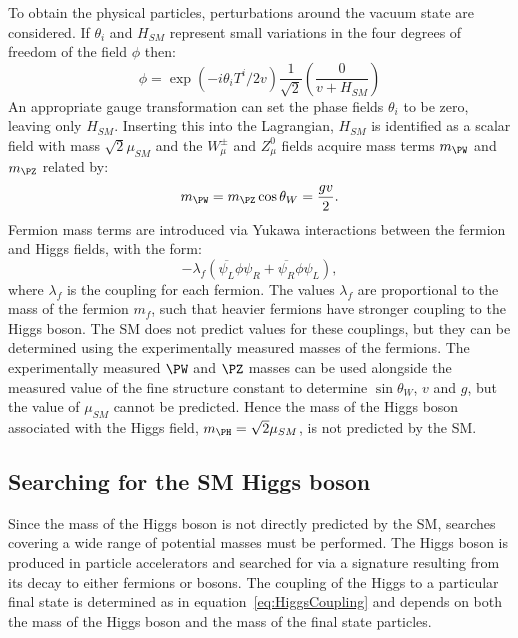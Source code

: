 To obtain the physical particles, perturbations around the vacuum state are
considered. If $\theta_{i}$ and $H_{SM}$ represent small variations in the four
degrees of freedom of the field $\phi$ then:
\begin{equation}
\phi = \exp(-i\theta_{i}T^{i}/2v)\frac{1}{\sqrt{2}}\left(\frac{0}{v+H_{SM}} \right)
\end{equation}
An appropriate gauge transformation can set the phase fields $\theta_{i}$ to be
zero, leaving only $H_{SM}$. Inserting this into the Lagrangian, $H_{SM}$ is
identified as a scalar field with mass $\sqrt{2}\mu_{SM}$ and the $W_{\mu}^{\pm}$
and $Z_{\mu}^{0}$ fields acquire mass terms $m_{\PW}$ and $m_{\PZ}$ related by:
\begin{equation}
m_{\PW} = m_{\PZ}\cos{\theta_{W}}=\frac{gv}{2}.
\label{eq:vaccummw}
\end{equation}
Fermion mass terms are introduced via Yukawa interactions between the fermion
and Higgs fields, with the form:
\begin{equation}
-\lambda_{f}( \overline{\psi_{L}}\phi\psi_{R} +
\overline{\psi_{R}}\phi\psi_{L}),  
\label{eq:HiggsCoupling}
\end{equation}
where $\lambda_{f}$ is the coupling for each fermion. The values $\lambda_{f}$ 
are proportional to the mass of the fermion $m_{f}$, such that heavier fermions have stronger
coupling to the Higgs boson. The \ac{SM} does not predict values for these
couplings, but they can be determined using the experimentally measured masses
of the fermions. The experimentally measured $\PW$ and $\PZ$ masses can be used
alongside the measured value of the fine structure constant to determine
$\sin{\theta_{W}}$, $v$ and $g$, but the value of $\mu_{SM}$ cannot be
predicted. Hence the mass of the Higgs boson associated with the Higgs field,
$m_{\PH}=\sqrt{2}\mu_{SM}$, is not predicted by the \ac{SM}.

\subsection{Searching for the SM Higgs boson}
\label{sec:LHCSMHiggs}

Since the mass of the Higgs boson is not directly predicted by the \ac{SM},
searches covering a wide range of potential masses must be performed.
The Higgs boson is produced in particle accelerators and searched for via a signature 
resulting from its decay to either fermions or bosons. The coupling of the
Higgs to a particular final state is determined as in equation~\ref{eq:HiggsCoupling} and
depends on both the mass of the Higgs boson and the mass of the final state
particles. 

